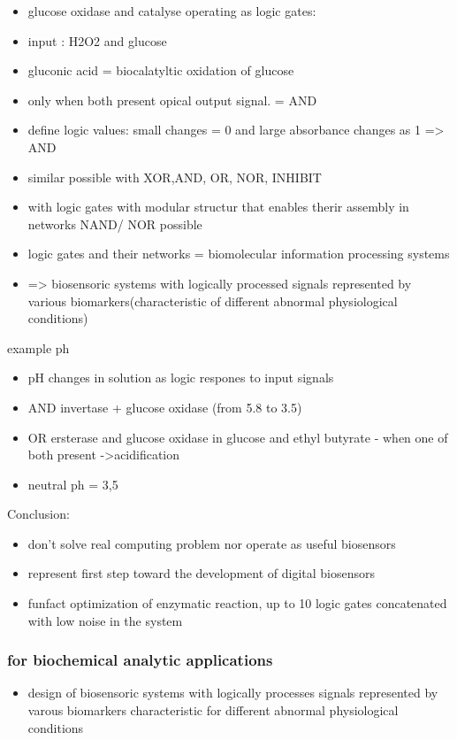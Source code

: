 \documentclass[runningheads]{llncs}
\begin{document}
\begin{itemize}
	\item glucose oxidase and catalyse operating as logic gates: 
	\item input : H2O2 and glucose
	\item gluconic acid = biocalatyltic oxidation of glucose 
	\item only when both present opical output signal. = AND
	\item define logic values: small changes = 0 and large absorbance changes as 1 => AND
	\item similar possible with XOR,AND, OR, NOR, INHIBIT
	\item with logic gates with modular structur that enables therir assembly in networks NAND/ NOR possible
	\item logic gates and their networks = biomolecular information processing systems 
	\item => biosensoric systems with logically processed signals represented by various biomarkers(characteristic of different abnormal physiological conditions)
\end{itemize}

example ph
\begin{itemize}
	\item pH changes in solution as logic respones to input signals
	\item AND invertase + glucose oxidase (from 5.8 to 3.5)
	\item OR ersterase and glucose oxidase in glucose and ethyl butyrate - when one of both present ->acidification  
	\item neutral ph = 3,5
\end{itemize}
Conclusion: 
\begin{itemize}
	\item don't solve real computing problem  nor operate as useful biosensors 
	\item represent first step toward the development of digital biosensors 
	\item funfact optimization of enzymatic reaction, up to 10 logic gates concatenated with low noise in the system 
\end{itemize}

	\subsubsection{for biochemical analytic applications}
		\begin{itemize}
			\item design of biosensoric systems with logically processes signals represented by varous biomarkers characteristic for different abnormal physiological conditions
		\end{itemize}
\end{document}

